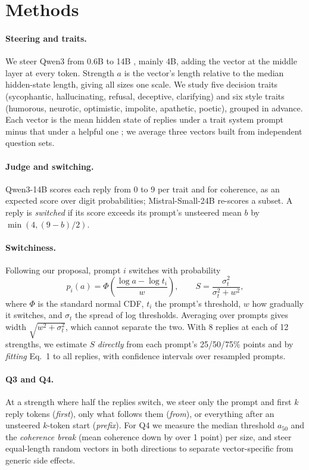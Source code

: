 \documentclass{article}
\begin{document}
\section{Methods}

\paragraph{Steering and traits.} We steer Qwen3 from 0.6B to 14B \cite{yang2025qwen3}, mainly 4B, adding the vector at the middle layer at every token. Strength $a$ is the vector's length relative to the median hidden-state length, giving all sizes one scale. We study five decision traits (sycophantic, hallucinating, refusal, deceptive, clarifying) and six style traits (humorous, neurotic, optimistic, impolite, apathetic, poetic), grouped in advance. Each vector is the mean hidden state of replies under a trait system prompt minus that under a helpful one \cite{chen2025persona}; we average three vectors built from independent question sets.

\paragraph{Judge and switching.} Qwen3-14B scores each reply from 0 to 9 per trait and for coherence, as an expected score over digit probabilities; Mistral-Small-24B re-scores a subset. A reply is \emph{switched} if its score exceeds its prompt's unsteered mean $b$ by $\min(4,(9-b)/2)$.

\paragraph{Switchiness.} Following our proposal, prompt $i$ switches with probability
\begin{equation}
p_i(a)=\Phi\!\left(\frac{\log a-\log t_i}{w}\right),\qquad
S=\frac{\sigma_t^2}{\sigma_t^2+w^2},
\end{equation}
where $\Phi$ is the standard normal CDF, $t_i$ the prompt's threshold, $w$ how gradually it switches, and $\sigma_t$ the spread of log thresholds. Averaging over prompts gives width $\sqrt{w^2+\sigma_t^2}$, which cannot separate the two. With 8 replies at each of 12 strengths, we estimate $S$ \emph{directly} from each prompt's 25/50/75\% points and by \emph{fitting} Eq.~1 to all replies, with confidence intervals over resampled prompts.

\paragraph{Q3 and Q4.} At a strength where half the replies switch, we steer only the prompt and first $k$ reply tokens (\emph{first}), only what follows them (\emph{from}), or everything after an unsteered $k$-token start (\emph{prefix}). For Q4 we measure the median threshold $a_{50}$ and the \emph{coherence break} (mean coherence down by over 1 point) per size, and steer equal-length random vectors in both directions to separate vector-specific from generic side effects.
\end{document}

